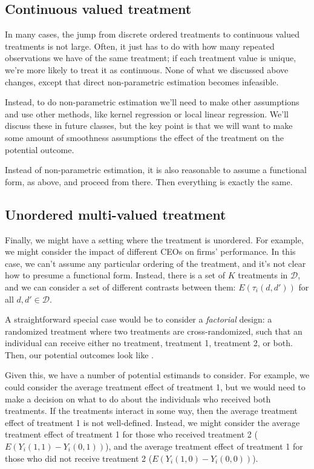 \documentclass{tufte-handout}
\theoremstyle{break}
\begin{document}
\subsection{Continuous valued treatment}
In many cases, the jump from discrete ordered treatments to continuous valued treatments is not large. Often, it just has to do with how many repeated observations we have of the same treatment; if each treatment value is unique, we're more likely to treat it as continuous. None of what we discussed above changes, except that direct non-parametric estimation becomes infeasible. 

Instead, to do non-parametric estimation we'll need to make other assumptions and use other methods, like kernel regression or local linear regression. We'll discuss these in future classes, but the key point is that we will want to make some amount of smoothness assumptions the effect of the treatment on the potential outcome.

Instead of non-parametric estimation, it is also reasonable to assume a functional form, as above, and proceed from there. Then everything is exactly the same. 

\subsection{Unordered multi-valued treatment}
Finally, we might have a setting where the treatment is unordered. For example, we might consider the impact of different CEOs on firms' performance. In this case, we can't assume any particular ordering of the treatment, and it's not clear how to presume a functional form. Instead, there is a set of $K$ treatments in $\mathcal{D}$, and we can consider a set of different contrasts between them: $E(\tau_{i}(d, d'))$ for all $d, d' \in \mathcal{D}$.

A straightforward special case would be to consider a \emph{factorial} design: a randomized treatment where two treatments are cross-randomized, such that an individual can receive either no treatment, treatment 1, treatment 2, or both. Then, our potential outcomes look like . 

Given this, we have a number of potential estimands to consider. For example, we could consider the average treatment effect of treatment 1, but we would need to make a decision on what to do about the individuals who received both treatments. If the treatments interact in some way, then the average treatment effect of treatment 1 is not well-defined. Instead, we might consider the average treatment effect of treatment 1 for those who received treatment 2 ($E(Y_{i}(1,1) - Y_{i}(0,1))$), and the average treatment effect of treatment 1 for those who did not receive treatment 2 ($E(Y_{i}(1,0) - Y_{i}(0,0))$). 
\end{document}
